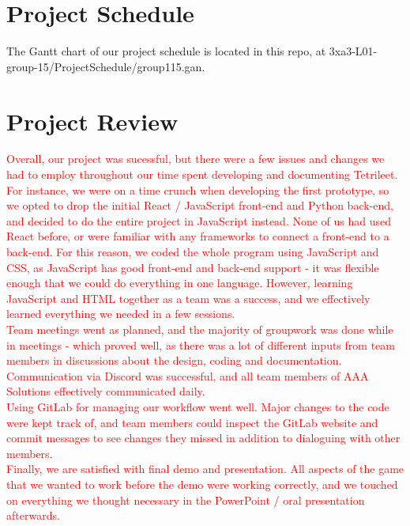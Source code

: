 \documentclass{article}
\begin{document}
\section{Project Schedule}

The Gantt chart of our project schedule is located in this repo, at 3xa3-L01-group-15/ProjectSchedule/group115.gan.

\section{Project Review}

\textcolor{red}{Overall, our project was sucessful, but there were a few issues and changes we had to employ throughout our time spent developing and documenting Tetrileet.
\\For instance, we were on a time crunch when developing the first prototype, so we opted to drop the initial React / JavaScript front-end and Python back-end, and decided to do the entire project in JavaScript instead. None of us had used React before, or were familiar with any frameworks to connect a front-end to a back-end. For this reason, we coded the whole program using JavaScript and CSS, as JavaScript has good front-end and back-end support - it was flexible enough that we could do everything in one language. However, learning JavaScript and HTML together as a team was a success, and we effectively learned everything we needed in a few sessions.
\\Team meetings went as planned, and the majority of groupwork was done while in meetings - which proved well, as there was a lot of different inputs from team members in discussions about the design, coding and documentation.
\\Communication via Discord was successful, and all team members of AAA Solutions effectively communicated  daily.
\\ Using GitLab for managing our workflow went well. Major changes to the code were kept track of, and team members could inspect the GitLab website and commit messages to see changes they missed in addition to dialoguing with other members.
\\Finally, we are satisfied with final demo and presentation. All aspects of the game that we wanted to work before the demo were working correctly, and we touched on everything we thought necessary in the PowerPoint / oral presentation afterwards.
}
\end{document}
